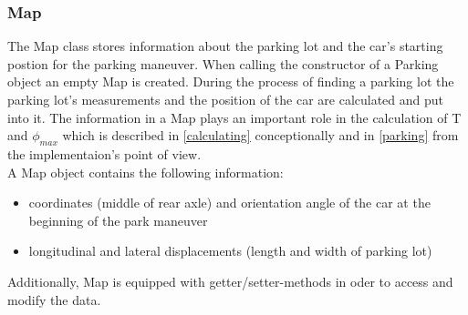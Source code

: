 \documentclass[paper=a4, fontsize=11pt]{scrreprt}
\begin{document}
\subsubsection{Map}
The Map class stores information about the parking lot and the car's starting postion for the parking maneuver. When calling the constructor of a Parking object an empty Map is created. During the process of finding a parking lot the parking lot's measurements and the position of the car are calculated and put into it. The information in a Map plays an important role in the calculation of T and $\phi_{max}$ which is described in \ref{calculating} conceptionally  and in \ref{parking} from the implementaion's point of view.\\
A Map object contains the following information:
\begin{itemize}
	\item coordinates (middle of rear axle) and orientation angle of the car at the beginning of the park maneuver
	\item longitudinal and lateral displacements (length and width of parking lot)
\end{itemize}
Additionally, Map is equipped with getter/setter-methods in oder to access and modify the data.
\end{document}
